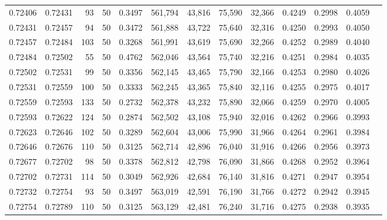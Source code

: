 \begin{tabular}{rrrrrrrrrrrrr}
0.72406 & 0.72431 &    93 &  50 &                                     0.3497 & 561,794 &  43,816 &  75,590 &  32,366 & 0.4249 & 0.2998 & 0.4059 \\
0.72431 & 0.72457 &    94 &  50 &                                     0.3472 & 561,888 &  43,722 &  75,640 &  32,316 & 0.4250 & 0.2993 & 0.4050 \\
0.72457 & 0.72484 &   103 &  50 &                                     0.3268 & 561,991 &  43,619 &  75,690 &  32,266 & 0.4252 & 0.2989 & 0.4040 \\
0.72484 & 0.72502 &    55 &  50 &                                     0.4762 & 562,046 &  43,564 &  75,740 &  32,216 & 0.4251 & 0.2984 & 0.4035 \\
0.72502 & 0.72531 &    99 &  50 &                                     0.3356 & 562,145 &  43,465 &  75,790 &  32,166 & 0.4253 & 0.2980 & 0.4026 \\
0.72531 & 0.72559 &   100 &  50 &                                     0.3333 & 562,245 &  43,365 &  75,840 &  32,116 & 0.4255 & 0.2975 & 0.4017 \\
0.72559 & 0.72593 &   133 &  50 &                                     0.2732 & 562,378 &  43,232 &  75,890 &  32,066 & 0.4259 & 0.2970 & 0.4005 \\
0.72593 & 0.72622 &   124 &  50 &                                     0.2874 & 562,502 &  43,108 &  75,940 &  32,016 & 0.4262 & 0.2966 & 0.3993 \\
0.72623 & 0.72646 &   102 &  50 &                                     0.3289 & 562,604 &  43,006 &  75,990 &  31,966 & 0.4264 & 0.2961 & 0.3984 \\
0.72646 & 0.72676 &   110 &  50 &                                     0.3125 & 562,714 &  42,896 &  76,040 &  31,916 & 0.4266 & 0.2956 & 0.3973 \\
0.72677 & 0.72702 &    98 &  50 &                                     0.3378 & 562,812 &  42,798 &  76,090 &  31,866 & 0.4268 & 0.2952 & 0.3964 \\
0.72702 & 0.72731 &   114 &  50 &                                     0.3049 & 562,926 &  42,684 &  76,140 &  31,816 & 0.4271 & 0.2947 & 0.3954 \\
0.72732 & 0.72754 &    93 &  50 &                                     0.3497 & 563,019 &  42,591 &  76,190 &  31,766 & 0.4272 & 0.2942 & 0.3945 \\
0.72754 & 0.72789 &   110 &  50 &                                     0.3125 & 563,129 &  42,481 &  76,240 &  31,716 & 0.4275 & 0.2938 & 0.3935 \\

\end{tabular}
